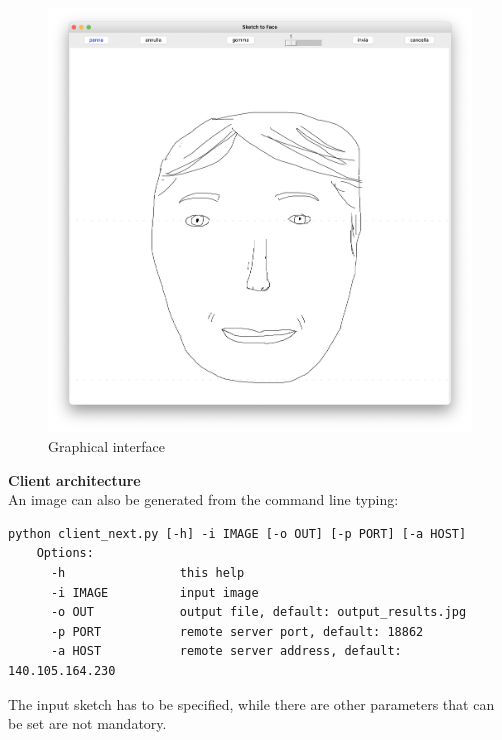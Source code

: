\begin{figure}[htbp]
\centering
  \includegraphics[scale=0.15]{figures/interface.png}
  \caption{Graphical interface}
  \label{fig:Graphical interface}
\end{figure}
\textbf{Client architecture} \\
An image can also be generated from the command line typing:
\begin{lstlisting}[numbers=none]
    python client_next.py [-h] -i IMAGE [-o OUT] [-p PORT] [-a HOST]
    Options:
      -h                this help
      -i IMAGE          input image
      -o OUT            output file, default: output_results.jpg
      -p PORT           remote server port, default: 18862
      -a HOST           remote server address, default: 140.105.164.230
\end{lstlisting}
The input sketch has to be specified, while there are other parameters that can be set are not mandatory.\\ \\
